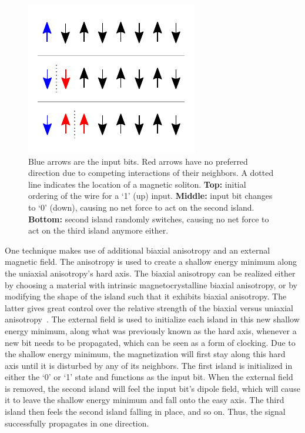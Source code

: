 \documentclass[11pt,a4paper,english]{article}
\begin{document}
\begin{figure}
    \centering
    \includegraphics[width=0.5\columnwidth]{Figures/Introduction/Soliton_random_walk_2steps.pdf}
    \caption{Blue arrows are the input bits. Red arrows have no preferred direction due to competing interactions of their neighbors. A dotted line indicates the location of a magnetic soliton. \textbf{Top:} initial ordering of the wire for a `1' (up) input. \textbf{Middle:} input bit changes to `0' (down), causing no net force to act on the second island. \textbf{Bottom:} second island randomly switches, causing no net force to act on the third island anymore either.}
    \label{fig:Intro_SolitonRandomWalk}
\end{figure}
One technique makes use of additional biaxial anisotropy and an external magnetic field. The anisotropy is used to create a shallow energy minimum along the uniaxial anisotropy's hard axis. The biaxial anisotropy can be realized either by choosing a material with intrinsic magnetocrystalline biaxial anisotropy, or by modifying the shape of the island such that it exhibits biaxial anisotropy. The latter gives great control over the relative strength of the biaxial versus uniaxial anisotropy~\cite{SubnanosecondPropagation_AnisotropyChains}. The external field is used to initialize each island in this new shallow energy minimum, along what was previously known as the hard axis, whenever a new bit needs to be propagated, which can be seen as a form of clocking. Due to the shallow energy minimum, the magnetization will first stay along this hard axis until it is disturbed by any of its neighbors. The first island is initialized in either the `0' or `1' state and functions as the input bit. When the external field is removed, the second island will feel the input bit's dipole field, which will cause it to leave the shallow energy minimum and fall onto the easy axis. The third island then feels the second island falling in place, and so on. Thus, the signal successfully propagates in one direction.~\cite{NML_Carlton}
\end{document}
